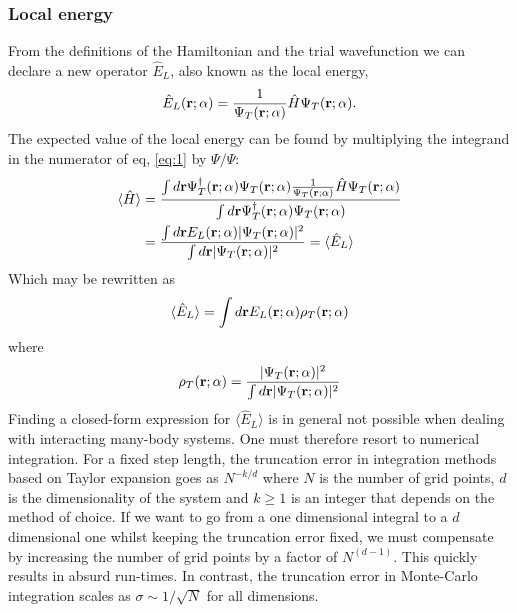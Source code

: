 \documentclass[
    a4paper, aps, twocolumn, floatfix, superscriptaddress,
    nofootinbib]{revtex4-1}
\begin{document}
\subsubsection{Local energy} From the definitions of the Hamiltonian and the trial wavefunction we can declare a new operator $\hat{E}_L$, also known as the local energy,
\begin{align}
    \hat{E}_L(\bold r; \alpha) = \frac{1}{\Psi_T(\bold r; \alpha)}\hat{H}\Psi_T(\bold r; \alpha). \label{eq:local_energy}
\end{align}
The expected value of the local energy can be found by multiplying the integrand in the numerator of eq, \eqref{eq:1} by $\Psi/\Psi$: 
\begin{align}
    \langle \hat{H} \rangle &= \frac{\int d\bold r \Psi_T^\dagger(\bold r; \alpha) \Psi_T(\bold r; \alpha) \frac{1}{\Psi_T(\bold r; \alpha)} \hat{H} \Psi_T(\bold r; \alpha)}{\int d\bold r \Psi_T^\dagger(\bold r; \alpha) \Psi_T(\bold r; \alpha)}\\
    &= \frac{\int d\bold r E_L(\bold r; \alpha) |\Psi_T(\bold r; \alpha)|^2}{\int d\bold r |\Psi_T(\bold r; \alpha)|^2} = \langle \hat{E}_L \rangle
\end{align}
Which may be rewritten as 
\begin{equation}
    \langle \hat{E}_L \rangle = \int d\bold r E_L(\bold r; \alpha) \rho_T(\bold r; \alpha)
\end{equation}
where 
\begin{equation}\label{eq:7}
    \rho_T(\bold r; \alpha) = \frac{ |\Psi_T(\bold r; \alpha)|^2}{\int d\bold r |\Psi_T(\bold r; \alpha)|^2}
\end{equation}
Finding a closed-form expression for $\langle \hat{E}_L \rangle$ is in general not possible when dealing with interacting many-body systems. One must therefore resort to numerical integration. For a fixed step length, the truncation error in integration methods based on Taylor expansion goes as $N^{-k/d}$ where $N$ is the number of grid points,  $d$ is the dimensionality of the system and $k \geq 1$ is an integer that depends on the method of choice. If we want to go from a  one dimensional integral to a $d$ dimensional one whilst keeping the truncation error fixed, we must compensate by increasing the number of grid points by a factor of $N^{(d-1)}$. This quickly results in absurd run-times.
In contrast, the truncation error in Monte-Carlo integration scales as $\sigma \sim 1/\sqrt{N}$ for all dimensions. 
\end{document}
